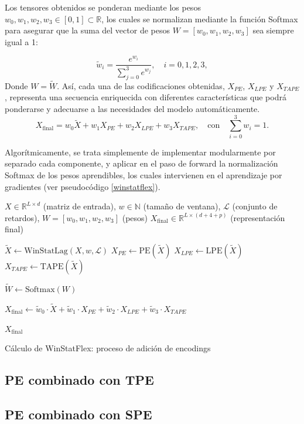 Los tensores obtenidos se ponderan mediante los pesos $w_0, w_1, w_2, w_3 \in [0,1] \subset \mathbb{R}$, los cuales se normalizan mediante la función Softmax para asegurar que la suma del vector de pesos $W = [w_0, w_1, w_2, w_3]$ sea siempre igual a 1:

\[
\tilde{w}_i = \frac{e^{w_i}}{\sum_{j=0}^3 e^{w_j}}, \quad i = 0,1,2,3,
\]
Donde $W = \tilde{W}$.
 Así, cada una de las codificaciones obtenidas, \(X_{PE}\), \(X_{LPE}\) y \(X_{TAPE}\), representa una secuencia enriquecida con diferentes características que podrá ponderarse y adecuarse a las necesidades del modelo automáticamente. 
\[
X_{\text{final}} = w_0 \tilde{X} + w_1 X_{PE} + w_2 X_{LPE} + w_3 X_{TAPE}, \quad \text{con} \quad \sum_{i=0}^3 w_i = 1.
\]

Algorítmicamente, se trata simplemente de implementar modularmente por separado cada componente, y aplicar en el paso de forward la normalización Softmax de los pesos aprendibles, los cuales intervienen en el aprendizaje por gradientes (ver pseudocódigo \ref{winstatflex}).

\begin{algorithm}[H]
	\begin{algorithmic}[1]
		\REQUIRE $X \in \mathbb{R}^{L \times d}$ (matriz de entrada), $w \in \mathbb{N}$ (tamaño de ventana), $\mathcal{L}$ (conjunto de retardos), $W = [w_0, w_1, w_2, w_3]$ (pesos)
		\ENSURE $X_{\text{final}} \in \mathbb{R}^{L \times (d + 4 + p)}$ (representación final)
		
		\STATE $\tilde{X} \gets \text{WinStatLag}(X, w, \mathcal{L})$ 
		\STATE $X_{PE} \gets \text{PE}(\tilde{X})$ 
		\STATE $X_{LPE} \gets \text{LPE}(\tilde{X})$ 
		\STATE $X_{TAPE} \gets \text{TAPE}(\tilde{X})$ 
		
		\STATE $\tilde{W} \gets \mathrm{Softmax}(W)$ 
		
		\STATE $X_{\text{final}} \gets \tilde{w}_0 \cdot \tilde{X} + \tilde{w}_1 \cdot X_{PE} + \tilde{w}_2 \cdot X_{LPE} + \tilde{w}_3 \cdot X_{TAPE}$
		
		\RETURN $X_{\text{final}}$
	\end{algorithmic}
	\caption{Cálculo de WinStatFlex: proceso de adición de encodings}
	\label{winstatflex}
\end{algorithm}


\subsection{PE combinado con TPE}
\subsection{PE combinado con SPE}


